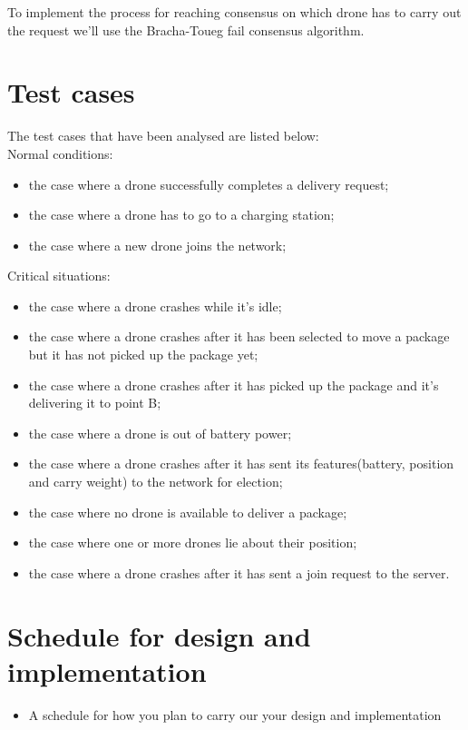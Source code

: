 \documentclass[a4paper, oneside]{memoir}
\begin{document}
To implement the process for reaching consensus on which drone has to carry out the request we'll use the Bracha-Toueg fail consensus algorithm.

\section{Test cases}

The test cases that have been analysed are listed below:\\

Normal conditions:
\begin{itemize}
	\item the case where a drone successfully completes a delivery request;
	\item the case where a drone has to go to a charging station;
	\item the case where a new drone joins the network;
\end{itemize}

Critical situations:
\begin{itemize}
	\item the case where a drone crashes while it's idle;
	\item the case where a drone crashes after it has been selected to move a package but it has not picked up the package yet;
	\item the case where a drone crashes after it has picked up the package and it's delivering it to point B;
	\item the case where a drone is out of battery power;
	\item the case where a drone crashes after it has sent its features(battery, position and carry weight) to the network for election;
	\item the case where no drone is available to deliver a package;
	\item the case where one or more drones lie about their position;
	\item the case where a drone crashes after it has sent a join request to the server.
\end{itemize}


\section{Schedule for design and implementation}

\begin{itemize}
\item A schedule for how you plan to carry our your design and implementation
\end{itemize}
\end{document}
